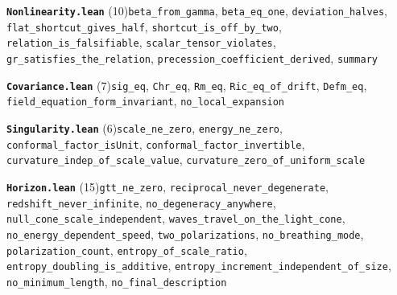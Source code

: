 \documentclass[11pt,a4paper]{article}
\theoremstyle{sudef}
\begin{document}
\noindent\textbf{\texttt{Nonlinearity.lean}} (10)\quad \texttt{beta\_\allowbreak from\_\allowbreak gamma}, \texttt{beta\_\allowbreak eq\_\allowbreak one}, \texttt{deviation\_\allowbreak halves}, \texttt{flat\_\allowbreak shortcut\_\allowbreak gives\_\allowbreak half}, \texttt{shortcut\_\allowbreak is\_\allowbreak off\_\allowbreak by\_\allowbreak two}, \texttt{relation\_\allowbreak is\_\allowbreak falsifiable}, \texttt{scalar\_\allowbreak tensor\_\allowbreak violates}, \texttt{gr\_\allowbreak satisfies\_\allowbreak the\_\allowbreak relation}, \texttt{precession\_\allowbreak coefficient\_\allowbreak derived}, \texttt{summary}\par\smallskip
\noindent\textbf{\texttt{Covariance.lean}} (7)\quad \texttt{sig\_\allowbreak eq}, \texttt{Chr\_\allowbreak eq}, \texttt{Rm\_\allowbreak eq}, \texttt{Ric\_\allowbreak eq\_\allowbreak of\_\allowbreak drift}, \texttt{Defm\_\allowbreak eq}, \texttt{field\_\allowbreak equation\_\allowbreak form\_\allowbreak invariant}, \texttt{no\_\allowbreak local\_\allowbreak expansion}\par\smallskip
\noindent\textbf{\texttt{Singularity.lean}} (6)\quad \texttt{scale\_\allowbreak ne\_\allowbreak zero}, \texttt{energy\_\allowbreak ne\_\allowbreak zero}, \texttt{conformal\_\allowbreak factor\_\allowbreak isUnit}, \texttt{conformal\_\allowbreak factor\_\allowbreak invertible}, \texttt{curvature\_\allowbreak indep\_\allowbreak of\_\allowbreak scale\_\allowbreak value}, \texttt{curvature\_\allowbreak zero\_\allowbreak of\_\allowbreak uniform\_\allowbreak scale}\par\smallskip
\noindent\textbf{\texttt{Horizon.lean}} (15)\quad \texttt{gtt\_\allowbreak ne\_\allowbreak zero}, \texttt{reciprocal\_\allowbreak never\_\allowbreak degenerate}, \texttt{redshift\_\allowbreak never\_\allowbreak infinite}, \texttt{no\_\allowbreak degeneracy\_\allowbreak anywhere}, \texttt{null\_\allowbreak cone\_\allowbreak scale\_\allowbreak independent}, \texttt{waves\_\allowbreak travel\_\allowbreak on\_\allowbreak the\_\allowbreak light\_\allowbreak cone}, \texttt{no\_\allowbreak energy\_\allowbreak dependent\_\allowbreak speed}, \texttt{two\_\allowbreak polarizations}, \texttt{no\_\allowbreak breathing\_\allowbreak mode}, \texttt{polarization\_\allowbreak count}, \texttt{entropy\_\allowbreak of\_\allowbreak scale\_\allowbreak ratio}, \texttt{entropy\_\allowbreak doubling\_\allowbreak is\_\allowbreak additive}, \texttt{entropy\_\allowbreak increment\_\allowbreak independent\_\allowbreak of\_\allowbreak size}, \texttt{no\_\allowbreak minimum\_\allowbreak length}, \texttt{no\_\allowbreak final\_\allowbreak description}\par\smallskip
\end{document}
